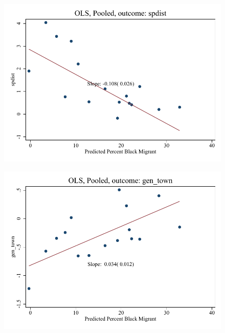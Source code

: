 \documentclass{article}
\begin{document}
\clearpage
\begin{figure}
	\centering
	\includegraphics[width=.8\textwidth]{figures/binscatter/pooled_spdist_ols_percent.pdf}
\end{figure}
\clearpage
\begin{figure}
	\centering
	\includegraphics[width=.8\textwidth]{figures/binscatter/pooled_gen_town_ols_percent.pdf}
\end{figure}
\clearpage
\end{document}
